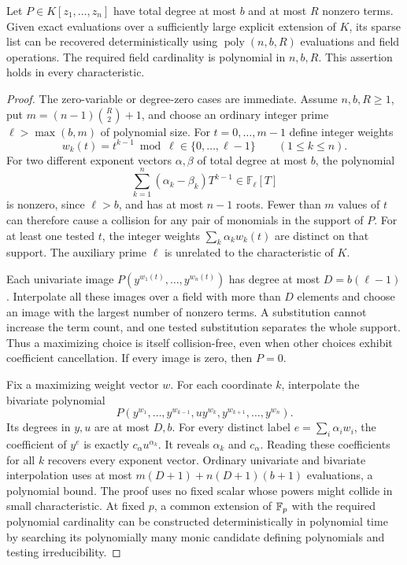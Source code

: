 \begin{lemma}
\label{sp:lem:sparse-interpolation}
Let $P\in K[z_1,\ldots,z_n]$ have total degree at most $b$ and at
most $R$ nonzero terms. Given exact evaluations over a sufficiently
large explicit extension of $K$, its sparse list can be recovered
deterministically using $\operatorname{poly}(n,b,R)$ evaluations and
field operations. The required field cardinality is polynomial in
$n,b,R$. This assertion holds in every characteristic.
\end{lemma}
\begin{proof}
The zero-variable or degree-zero cases are immediate. Assume
$n,b,R\geq1$, put $m=(n-1)\binom R2+1$, and choose an ordinary
integer prime $\ell>\max(b,m)$ of polynomial size. For
$t=0,\ldots,m-1$ define integer weights
\[
 w_k(t)=t^{k-1}\bmod\ell\in\{0,\ldots,\ell-1\}
 \qquad(1\leq k\leq n).
\]
For two different exponent vectors $\alpha,\beta$ of total degree
at most $b$, the polynomial
\[
 \sum_{k=1}^n(\alpha_k-\beta_k)T^{k-1}\in\mathbb F_\ell[T]
\]
is nonzero, since $\ell>b$, and has at most $n-1$ roots. Fewer than
$m$ values of $t$ can therefore cause a collision for any pair of
monomials in the support of $P$. For at least one tested $t$, the
integer weights $\sum_k\alpha_k w_k(t)$ are distinct on that support.
The auxiliary prime $\ell$ is unrelated to the characteristic of $K$.

Each univariate image
$P(y^{w_1(t)},\ldots,y^{w_n(t)})$ has degree at most
$D=b(\ell-1)$. Interpolate all these images over a field with more
than $D$ elements and choose an image with the largest number of
nonzero terms. A substitution cannot increase the term count, and
one tested substitution separates the whole support. Thus a maximizing
choice is itself collision-free, even when other choices exhibit
coefficient cancellation. If every image is zero, then $P=0$.

Fix a maximizing weight vector $w$. For each coordinate $k$,
interpolate the bivariate polynomial
\[
 P(y^{w_1},\ldots,y^{w_{k-1}},u y^{w_k},
                 y^{w_{k+1}},\ldots,y^{w_n}).
\]
Its degrees in $y,u$ are at most $D,b$. For every distinct label
$e=\sum_i\alpha_iw_i$, the coefficient of $y^e$ is exactly
$c_\alpha u^{\alpha_k}$. It reveals $\alpha_k$ and $c_\alpha$.
Reading these coefficients for all $k$ recovers every exponent vector.
Ordinary univariate and bivariate interpolation uses at most
$m(D+1)+n(D+1)(b+1)$ evaluations, a polynomial bound.
The proof uses no fixed scalar whose powers might collide in small
characteristic. At fixed $p$, a common extension of $\mathbb F_p$ with the
required polynomial cardinality can be constructed deterministically
in polynomial time by searching its polynomially many monic candidate
defining polynomials and testing irreducibility.
\end{proof}

